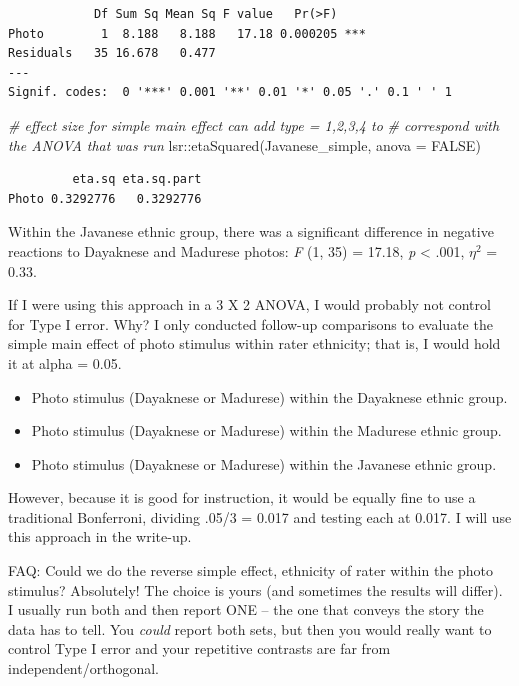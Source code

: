 \documentclass[
  11pt,
]{book}
\newenvironment{Shaded}{\begin{snugshade}}{\end{snugshade}}
\newcommand{\AttributeTok}[1]{\textcolor[rgb]{0.77,0.63,0.00}{#1}}
\newcommand{\CommentTok}[1]{\textcolor[rgb]{0.56,0.35,0.01}{\textit{#1}}}
\newcommand{\ConstantTok}[1]{\textcolor[rgb]{0.00,0.00,0.00}{#1}}
\newcommand{\FunctionTok}[1]{\textcolor[rgb]{0.00,0.00,0.00}{#1}}
\newcommand{\NormalTok}[1]{#1}
\newcommand{\SpecialCharTok}[1]{\textcolor[rgb]{0.00,0.00,0.00}{#1}}
\providecommand{\tightlist}{%
  \setlength{\itemsep}{0pt}\setlength{\parskip}{0pt}}
\begin{document}
\begin{verbatim}
            Df Sum Sq Mean Sq F value   Pr(>F)    
Photo        1  8.188   8.188   17.18 0.000205 ***
Residuals   35 16.678   0.477                     
---
Signif. codes:  0 '***' 0.001 '**' 0.01 '*' 0.05 '.' 0.1 ' ' 1
\end{verbatim}

\begin{Shaded}
\begin{Highlighting}[]
\CommentTok{\# effect size for simple main effect can add \textquotesingle{}type = 1,2,3,4\textquotesingle{} to}
\CommentTok{\# correspond with the ANOVA that was run}
\NormalTok{lsr}\SpecialCharTok{::}\FunctionTok{etaSquared}\NormalTok{(Javanese\_simple, }\AttributeTok{anova =} \ConstantTok{FALSE}\NormalTok{)}
\end{Highlighting}
\end{Shaded}

\begin{verbatim}
         eta.sq eta.sq.part
Photo 0.3292776   0.3292776
\end{verbatim}

Within the Javanese ethnic group, there was a significant difference in negative reactions to Dayaknese and Madurese photos: \emph{F} (1, 35) = 17.18, \emph{p} \textless{} .001, \(\eta ^{2}\) = 0.33.

If I were using this approach in a 3 X 2 ANOVA, I would probably not control for Type I error. Why? I only conducted follow-up comparisons to evaluate the simple main effect of photo stimulus within rater ethnicity; that is, I would hold it at alpha = 0.05.

\begin{itemize}
\tightlist
\item
  Photo stimulus (Dayaknese or Madurese) within the Dayaknese ethnic group.
\item
  Photo stimulus (Dayaknese or Madurese) within the Madurese ethnic group.
\item
  Photo stimulus (Dayaknese or Madurese) within the Javanese ethnic group.
\end{itemize}

However, because it is good for instruction, it would be equally fine to use a traditional Bonferroni, dividing .05/3 = 0.017 and testing each at 0.017. I will use this approach in the write-up.

FAQ: Could we do the reverse simple effect, ethnicity of rater within the photo stimulus? Absolutely! The choice is yours (and sometimes the results will differ). I usually run both and then report ONE -- the one that conveys the story the data has to tell. You \emph{could} report both sets, but then you would really want to control Type I error and your repetitive contrasts are far from independent/orthogonal.
\end{document}
